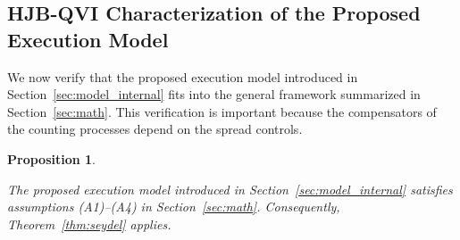 \documentclass[12pt]{article}
\newtheorem{proposition}[thm]{Proposition}
\begin{document}
\subsection{HJB-QVI Characterization of the Proposed Execution Model}
\label{sec:hjbqvi_characterization}

We now verify that the proposed execution model introduced in Section~\ref{sec:model_internal}
fits into the general framework summarized in Section~\ref{sec:math}. 
This verification is important because the compensators of the counting processes depend on the spread controls.

\begin{proposition}
\label{prop:verification}

The proposed execution model introduced in Section~\ref{sec:model_internal}
satisfies assumptions (A1)--(A4) in Section~\ref{sec:math}.
Consequently, Theorem~\ref{thm:seydel} applies.

\end{proposition}
\end{document}
